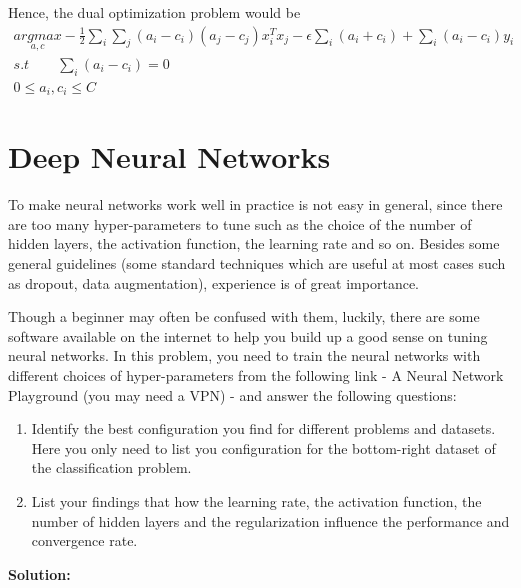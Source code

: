 \documentclass[12pt,a4paper]{article}
\begin{document}
	\noindent Hence, the dual optimization problem would be
	\begin{align*}
		\underset{a, c}{argmax}-\frac{1}{2}\sum_{i}\sum_{j}(a_i-c_i)(a_j-c_j)x_i^Tx_j-\epsilon\sum_{i}(a_i+c_i)+\sum_{i}(a_i-c_i)y_i \\
		s.t \qquad \sum_{i}(a_i-c_i)=0\qquad\qquad\qquad\qquad\qquad\qquad\\
		0 \leq a_i, c_i \leq C\qquad\qquad\qquad\qquad\qquad\qquad
	\end{align*}
	
	\section{Deep Neural Networks}
	
	\noindent To make neural networks work well in practice is not easy in general, since there are too many hyper-parameters to tune such as the choice of the number of hidden layers, the activation function, the learning rate and so on. Besides some general guidelines (some standard techniques which are useful at most cases such as dropout, data augmentation), experience is of great importance.
	
	\noindent Though a beginner may often be confused with them, luckily, there are some software available on the internet to help you build up a good sense on tuning neural networks. In this problem, you need to train the neural networks with different choices of hyper-parameters from the following link - A Neural Network Playground (you may need a VPN) - and answer the following questions:
	
	\begin{enumerate}
		\item Identify the best configuration you find for different problems and datasets. Here you only need to list you configuration for the bottom-right dataset of the classification problem.
		
		\item List your findings that how the learning rate, the activation function, the number of hidden layers and the regularization influence the performance and convergence rate.
	\end{enumerate}

	\noindent \textbf{Solution:}
	
\end{document}
